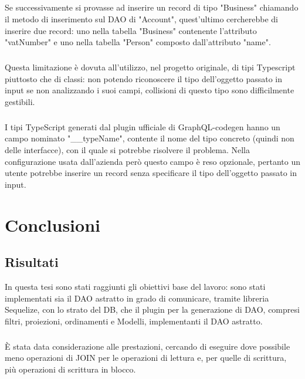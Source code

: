 \documentclass[a4paper, 12pt]{report}
\begin{document}
      \paragraph*{}
      Se successivamente si provasse ad inserire un record di tipo "Business" chiamando il metodo di inserimento sul DAO di "Account", quest'ultimo cercherebbe di inserire due record: uno nella tabella "Business" contenente l'attributo "vatNumber" e uno nella tabella "Person" composto dall'attributo "name".
      \paragraph*{}
      Questa limitazione è dovuta all'utilizzo, nel progetto originale, di tipi Typescript piuttosto che di classi: non potendo riconoscere il tipo dell'oggetto passato in input se non analizzando i suoi campi, collisioni di questo tipo sono difficilmente gestibili.
      \paragraph*{}
      I tipi TypeScript generati dal plugin ufficiale di GraphQL-codegen hanno un campo nominato "__typeName", contente il nome del tipo concreto (quindi non delle interfacce), con il quale si potrebbe risolvere il problema.
      Nella configurazione usata dall'azienda però questo campo è reso opzionale, pertanto un utente potrebbe inserire un record senza specificare il tipo dell'oggetto passato in input.
    \newpage
    \chapter{Conclusioni}
      \section*{Risultati}
      In questa tesi sono stati raggiunti gli obiettivi base del lavoro: sono stati implementati sia il DAO astratto in grado di comunicare, tramite libreria Sequelize, con lo strato del DB, che il plugin per la generazione di DAO, compresi filtri, proiezioni, ordinamenti e Modelli, implementanti il DAO astratto.
      \paragraph*{}
        È stata data considerazione alle prestazioni, cercando di eseguire dove possibile meno operazioni di JOIN per le operazioni di lettura e, per quelle di scrittura, più operazioni di scrittura in blocco.
\end{document}
